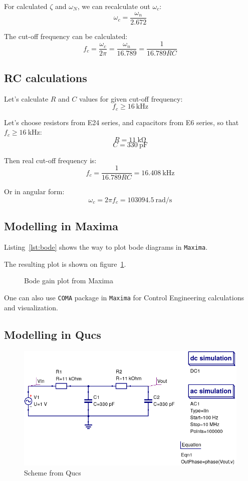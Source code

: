 \documentclass[12pt, a4paper]{article}
\newcommand{\appname}[1]{\texttt{#1}}
\begin{document}
For calculated $\zeta$ and $\omega_N$, we can recalculate out $\omega_c$:
\[ \omega_c = \frac{\omega_n}{2.672} \]

The cut-off frequency can be calculated:
\[ f_c = \frac{\omega_c}{2 \pi} = \frac{\omega_n}{16.789}
       = \frac{1}{16.789 R C} \]

\subsection{RC calculations}

Let's calculate $R$ and $C$ values for given cut-off frequency:
\[ f_c \geqslant \SI{16}{\kilo\hertz} \]

Let's choose resistors from E24 series, and capacitors from E6 series, so
that $f_c \geqslant \SI{16}{\kilo\hertz}$:
\[ R = \SI{11}{\kilo\ohm} \]
\[ C = \SI{330}{\pico\farad} \]

Then real cut-off frequency is:
\[ f_c = \frac{1}{16.789 R C} = \SI{16.408}{\kilo\hertz} \]

Or in angular form:
\[ \omega_c = 2 \pi f_c = \SI{103094.5}{\radian\per\second} \]

\subsection{Modelling in Maxima}

Listing~\ref{lst:bode} shows the way to plot bode diagrams in \appname{Maxima}.



The resulting plot is shown on figure~\ref{fig:bode}.

\begin{figure}[h!]
\centering

\caption{Bode gain plot from Maxima}
\label{fig:bode}
\end{figure}

One can also use \appname{COMA} package in \appname{Maxima} for Control
Engineering calculations and visualization.

\subsection{Modelling in Qucs}

\begin{figure}[h!]
\centering
\includegraphics[width = 400pt]{images/qucs-scheme.png}
\caption{Scheme from Qucs}
\label{fig:qucs_scheme}
\end{figure}
\end{document}
